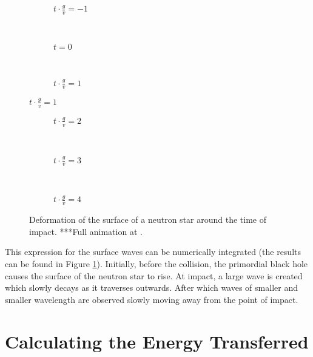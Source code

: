\begin{figure}[p]
\begin{centering}
 \begin{subfigure}{\textwidth}
  
  \caption{$t \cdot \frac{g}{v} = -1$}
 \end{subfigure} \\
 \begin{subfigure}{\textwidth}
  
  \caption{$t = 0$}
 \end{subfigure} \\
 \begin{subfigure}{\textwidth}
  
  \caption{$t \cdot \frac{g}{v} = 1$}
 \end{subfigure}
\end{centering}
\end{figure}

\begin{figure}[p] \ContinuedFloat
\begin{centering}
 \begin{subfigure}{\textwidth}
  
  \caption{$t \cdot \frac{g}{v} = 2$}
 \end{subfigure} \\
 \begin{subfigure}{\textwidth}
  
  \caption{$t \cdot \frac{g}{v} = 3$}
 \end{subfigure} \\
  \begin{subfigure}{\textwidth}
  
  \caption{$t \cdot \frac{g}{v} = 4$}
 \end{subfigure}
 \end{centering}
 \caption{Deformation of the surface of a neutron star around the time of impact. ***Full animation at .}
 \label{fig:eta}
\end{figure}

This expression for the surface waves can be numerically integrated (the results can be found in Figure \ref{fig:eta}). Initially, before the collision, the primordial black hole causes the surface of the neutron star to rise. At impact, a large wave is created which slowly decays as it traverses outwards. After which waves of smaller and smaller wavelength are observed slowly moving away from the point of impact.

\section{Calculating the Energy Transferred}
\label{chap:energy}

